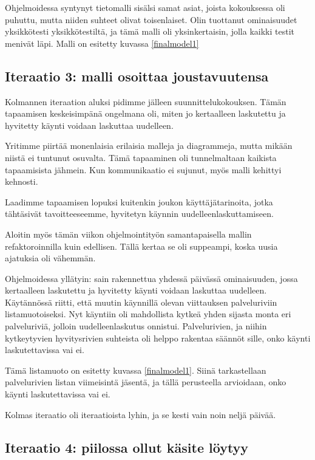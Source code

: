 Ohjelmoidessa syntynyt tietomalli sisälsi samat asiat, joista
kokouksessa oli puhuttu, mutta niiden suhteet olivat toisenlaiset. Olin
tuottanut ominaisuudet yksikkötesti yksikkötestiltä, ja tämä malli oli
yksinkertaisin, jolla kaikki testit menivät läpi. Malli on esitetty
kuvassa \ref{finalmodel1}

\hypertarget{iteraatio-3-malli-osoittaa-joustavuutensa}{%
\subsection{Iteraatio 3: malli osoittaa
joustavuutensa}\label{iteraatio-3-malli-osoittaa-joustavuutensa}}

Kolmannen iteraation aluksi pidimme jälleen suunnittelukokouksen. Tämän
tapaamisen keskeisimpänä ongelmana oli, miten jo kertaalleen laskutettu
ja hyvitetty käynti voidaan laskuttaa uudelleen.

Yritimme piirtää monenlaisia erilaisia malleja ja diagrammeja, mutta
mikään niistä ei tuntunut osuvalta. Tämä tapaaminen oli tunnelmaltaan
kaikista tapaamisista jähmein. Kun kommunikaatio ei sujunut, myös malli
kehittyi kehnosti.

Laadimme tapaamisen lopuksi kuitenkin joukon käyttäjätarinoita, jotka
tähtäsivät tavoitteeseemme, hyvitetyn käynnin uudelleenlaskuttamiseen.

Aloitin myös tämän viikon ohjelmointityön samantapaisella mallin
refaktoroinnilla kuin edellisen. Tällä kertaa se oli suppeampi, koska
uusia ajatuksia oli vähemmän.

Ohjelmoidessa yllätyin: sain rakennettua yhdessä päivässä ominaisuuden,
jossa kertaalleen laskutettu ja hyvitetty käynti voidaan laskuttaa
uudelleen. Käytännössä riitti, että muutin käynnillä olevan viittauksen
palveluriviin listamuotoiseksi. Nyt käyntiin oli mahdollista kytkeä
yhden sijasta monta eri palveluriviä, jolloin uudelleenlaskutus
onnistui. Palvelurivien, ja niihin kytkeytyvien hyvitysrivien suhteista
oli helppo rakentaa säännöt sille, onko käynti laskutettavissa vai ei.

Tämä listamuoto on esitetty kuvassa \ref{finalmodel1}. Siinä
tarkastellaan palvelurivien listan viimeisintä jäsentä, ja tällä
perusteella arvioidaan, onko käynti laskutettavissa vai ei.

Kolmas iteraatio oli iteraatioista lyhin, ja se kesti vain noin neljä
päivää.

\hypertarget{iteraatio-4-piilossa-ollut-kuxe4site-luxf6ytyy}{%
\subsection{Iteraatio 4: piilossa ollut käsite
löytyy}\label{iteraatio-4-piilossa-ollut-kuxe4site-luxf6ytyy}}


